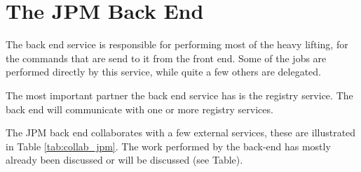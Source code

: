 \section{The JPM Back End}
\label{sec:jpm_back}

The back end service is responsible for performing most of the heavy lifting,
for the commands that are send to it from the front end. Some of the jobs
are performed directly by this service, while quite a few others are
delegated.

The most important partner the back end service has is the registry service.
The back end will communicate with one or more registry services.

The JPM back end collaborates with a few external services, these are
illustrated in Table \ref{tab:collab_jpm}. The work performed by the back-end
has mostly already been discussed or will be discussed (see Table).

